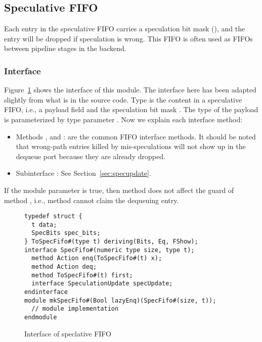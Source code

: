 \subsection{Speculative FIFO}\label{sec:specfifo}

Each entry in the speculative FIFO carries a speculation bit mask (), and the entry will be dropped if speculation is wrong.
This FIFO is often used as FIFOs between pipeline stages in the backend.

\subsubsection{Interface}

Figure~\ref{fig:specfifo-ifc} shows the interface of this module.
The interface here has been adapted slightly from what is in the source code.
Type  is the content in a speculative FIFO, i.e., a payload field  and the speculation bit mask .
The type of the payload is parameterized by type parameter .
Now we explain each interface method:
\begin{itemize}
    \item Methods ,  and : are the common FIFO interface methods.
    It should be noted that wrong-path entries killed by mis-speculations will not show up in the dequeue port because they are already dropped.
    \item Subinterface : See Section~\ref{sec:specupdate}.
\end{itemize}
If the module parameter  is true, then method  does not affect the guard of method , i.e., method  cannot claim the dequeuing entry.

\begin{figure}[t]
\begin{lstlisting}[caption={}]
typedef struct {
  t data;
  SpecBits spec_bits;
} ToSpecFifo#(type t) deriving(Bits, Eq, FShow);
interface SpecFifo#(numeric type size, type t);
  method Action enq(ToSpecFifo#(t) x);
  method Action deq;
  method ToSpecFifo#(t) first;
  interface SpeculationUpdate specUpdate;
endinterface
module mkSpecFifo#(Bool lazyEnq)(SpecFifo#(size, t));
  // module implementation
endmodule
\end{lstlisting}
\caption{Interface of speclative FIFO}\label{fig:specfifo-ifc}
\end{figure}

